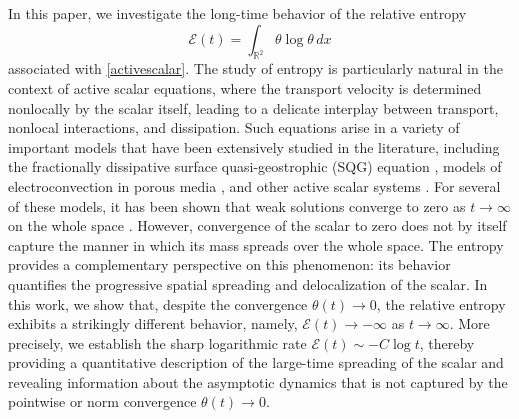 \documentclass[12pt,reqno]{amsart}
\newcommand{\be}{\begin{equation}}
\newcommand{\ee}{\end{equation}}
\begin{document}
In this paper, we investigate the long-time behavior of the relative entropy 
\be 
\mathcal{E}(t)=\int_{\mathbb{R}^2}\theta\log\theta\,dx
\ee associated with \eqref{activescalar}. The study of entropy is particularly natural in the context of active scalar equations, where the transport velocity is determined nonlocally by the scalar itself, leading to a delicate interplay between transport, nonlocal interactions, and dissipation. Such equations arise in a variety of important models that have been extensively studied in the literature, including the fractionally dissipative surface quasi-geostrophic (SQG) equation \cite{buckmaster2019nonuniqueness, constantin2001critical, constantin2016critical,  constantin2020estimates, constantin2018inviscid, constantin2023global, constantin1994formation, constantin2018local, constantin2015long, constantin2012nonlinear, constantin1999behavior, constantin2008regularity, ignatova2019construction, zelati2016global, kiselev2007global, stokols2020holder}, models of electroconvection in porous media \cite{AbdoIgnatova2023, Abdo2026Electroconvection}, and other active scalar systems \cite{abdo2024regularity, castro2009incompressible, dabkowski2014global, hassainia2021kam,  hmidi2017existence, isett2015holder, shvydkoy2011convex}. For several of these models, it has been shown that weak solutions converge to zero as $t\to\infty$ on the whole space \cite{constantin1999behavior}. However, convergence of the scalar to zero does not by itself capture the manner in which its mass spreads over the whole space. The entropy provides a complementary perspective on this phenomenon: its behavior quantifies the progressive spatial spreading and delocalization of the scalar. In this work, we show that, despite the convergence $\theta(t)\to0$, the relative entropy exhibits a strikingly different behavior, namely, $\mathcal{E}(t)\to-\infty$ as $t\to\infty$. More precisely, we establish the sharp logarithmic rate $\mathcal{E}(t)\sim -C\log t$, thereby providing a quantitative description of the large-time spreading of the scalar and revealing information about the asymptotic dynamics that is not captured by the pointwise or norm convergence $\theta(t)\to0$.
\end{document}
